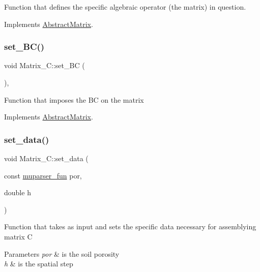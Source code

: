 Function that defines the specific algebraic operator (the matrix) in question. 

Implements \hyperlink{classAbstractMatrix_a40016da151226fbfcd444839943d8fe3}{Abstract\+Matrix}.

\mbox{\label{classMatrix__C_a9235c2dbf2853fae4122251726a7efce}} 
\subsubsection{\texorpdfstring{set\+\_\+\+B\+C()}{set\_BC()}}
{\footnotesize\ttfamily void Matrix\+\_\+\+C\+::set\+\_\+\+BC (\begin{DoxyParamCaption}{ }\end{DoxyParamCaption})\hspace{0.3cm}{\ttfamily [override]}, {\ttfamily [virtual]}}

Function that imposes the BC on the matrix 

Implements \hyperlink{classAbstractMatrix_aa0a17dacbeede4180531b115d4a9f3eb}{Abstract\+Matrix}.

\mbox{\label{classMatrix__C_af91d61fdcd02ac2c6c87d2dbdbdf18a2}} 
\subsubsection{\texorpdfstring{set\+\_\+data()}{set\_data()}}
{\footnotesize\ttfamily void Matrix\+\_\+\+C\+::set\+\_\+data (\begin{DoxyParamCaption}\item[{const \hyperlink{classmuparser__fun}{muparser\+\_\+fun}}]{por,  }\item[{double}]{h }\end{DoxyParamCaption})}

Function that takes as input and sets the specific data necessary for assemblying matrix C 
\begin{DoxyParams}{Parameters}
{\em por} & is the soil porosity \\
\hline
{\em h} & is the spatial step \\
\hline
\end{DoxyParams}
\mbox{\label{classMatrix__C_af305bfe533e702d629df3fb0409bc8d2}} 
